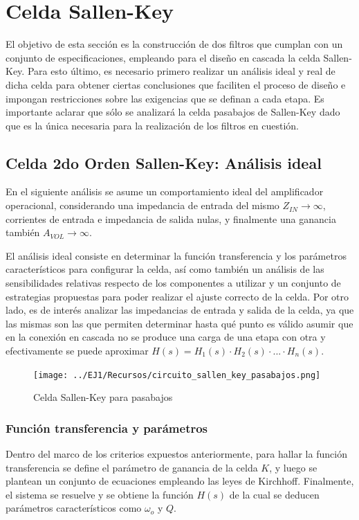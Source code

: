 
\section{Celda Sallen-Key}
El objetivo de esta secci\'on es la construcci\'on de dos filtros que cumplan con un conjunto de especificaciones,
empleando para el dise\~no en cascada la celda Sallen-Key. Para esto \'ultimo, es necesario primero realizar un an\'alisis ideal
y real de dicha celda para obtener ciertas conclusiones que faciliten el proceso de dise\~no e impongan restricciones sobre
las exigencias que se definan a cada etapa. Es importante aclarar que s\'olo se analizar\'a la celda pasabajos de Sallen-Key dado
que es la \'unica necesaria para la realizaci\'on de los filtros en cuesti\'on.

\subsection{Celda 2do Orden Sallen-Key: An\'alisis ideal}
En el siguiente an\'alisis se asume un comportamiento ideal del amplificador operacional, considerando una impedancia de entrada del mismo
$Z_{IN} \rightarrow \infty$, corrientes de entrada e impedancia de salida nulas, y finalmente una ganancia tambi\'en $A_{VOL} \rightarrow \infty$.

El an\'alisis ideal consiste en determinar la funci\'on transferencia y los par\'ametros caracter\'isticos para configurar la celda, as\'i como tambi\'en un an\'alisis de las sensibilidades relativas
respecto de los componentes a utilizar y un conjunto de estrategias propuestas para poder realizar el ajuste correcto de la celda. Por otro lado, es de inter\'es analizar las impedancias de entrada y salida de la celda,
ya que las mismas son las que permiten determinar hasta qu\'e punto es v\'alido asumir que en la conexi\'on en cascada no se produce una carga de una etapa con otra y efectivamente se puede aproximar $H(s) = H_1(s) \cdot H_2(s) \cdot ... \cdot H_n(s)$.

\begin{figure}[H]
	\centering
	\texttt{[image: ../EJ1/Recursos/circuito\_sallen\_key\_pasabajos.png]}
	\caption{Celda Sallen-Key para pasabajos}
	\label{circuito_sallen_key_pasabajos}
\end{figure}

\subsubsection{Funci\'on transferencia y par\'ametros}
Dentro del marco de los criterios expuestos anteriormente, para hallar la funci\'on transferencia se define el par\'ametro de ganancia de la celda $K$, y luego
se plantean un conjunto de ecuaciones empleando las leyes de Kirchhoff. Finalmente, el sistema se resuelve y se obtiene la funci\'on $H(s)$ de la cual se deducen par\'ametros
caracter\'isticos como $\omega_o$ y $Q$.

